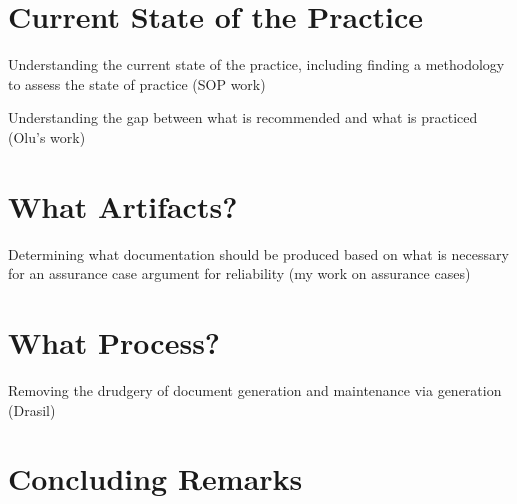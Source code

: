 \documentclass[sigconf, authorversion, nonacm]{acmart}
\begin{document}
\section{Current State of the Practice}

Understanding the current state of the practice, including finding a methodology
to assess the state of practice (SOP work) 

Understanding the gap between what is recommended and what is practiced (Olu’s
work) 

\section{What Artifacts?}

Determining what documentation should be produced based on what is necessary for
an assurance case argument for reliability (my work on assurance cases) 

\section{What Process?}

Removing the drudgery of document generation and maintenance via generation
(Drasil) 

\section{Concluding Remarks}



\end{document}
